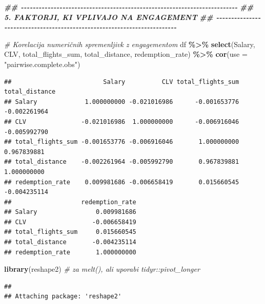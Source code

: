 \documentclass[
]{article}
\newenvironment{Shaded}{\begin{snugshade}}{\end{snugshade}}
\newcommand{\AttributeTok}[1]{\textcolor[rgb]{0.13,0.29,0.53}{#1}}
\newcommand{\CommentTok}[1]{\textcolor[rgb]{0.56,0.35,0.01}{\textit{#1}}}
\newcommand{\DocumentationTok}[1]{\textcolor[rgb]{0.56,0.35,0.01}{\textbf{\textit{#1}}}}
\newcommand{\FunctionTok}[1]{\textcolor[rgb]{0.13,0.29,0.53}{\textbf{#1}}}
\newcommand{\NormalTok}[1]{#1}
\newcommand{\SpecialCharTok}[1]{\textcolor[rgb]{0.81,0.36,0.00}{\textbf{#1}}}
\newcommand{\StringTok}[1]{\textcolor[rgb]{0.31,0.60,0.02}{#1}}
\begin{document}
\begin{Shaded}
\begin{Highlighting}[]
\DocumentationTok{\#\# {-}{-}{-}{-}{-}{-}{-}{-}{-}{-}{-}{-}{-}{-}{-}{-}{-}{-}{-}{-}{-}{-}{-}{-}{-}{-}{-}{-}{-}{-}{-}{-}{-}{-}{-}{-}{-}{-}{-}{-}{-}{-}{-}{-}{-}{-}{-}{-}{-}{-}{-}{-}{-}{-}{-}{-}{-}{-}{-}{-}{-}{-}{-}{-}{-}{-}{-}{-}{-}{-}{-}{-}{-}}
\DocumentationTok{\#\# 5. FAKTORJI, KI VPLIVAJO NA ENGAGEMENT}
\DocumentationTok{\#\# {-}{-}{-}{-}{-}{-}{-}{-}{-}{-}{-}{-}{-}{-}{-}{-}{-}{-}{-}{-}{-}{-}{-}{-}{-}{-}{-}{-}{-}{-}{-}{-}{-}{-}{-}{-}{-}{-}{-}{-}{-}{-}{-}{-}{-}{-}{-}{-}{-}{-}{-}{-}{-}{-}{-}{-}{-}{-}{-}{-}{-}{-}{-}{-}{-}{-}{-}{-}{-}{-}{-}{-}{-}}

\CommentTok{\# Korelacija numeričnih spremenljivk z engagementom}
\NormalTok{df }\SpecialCharTok{\%\textgreater{}\%}
  \FunctionTok{select}\NormalTok{(Salary, CLV, total\_flights\_sum, total\_distance, redemption\_rate) }\SpecialCharTok{\%\textgreater{}\%}
  \FunctionTok{cor}\NormalTok{(}\AttributeTok{use =} \StringTok{"pairwise.complete.obs"}\NormalTok{)}
\end{Highlighting}
\end{Shaded}

\begin{verbatim}
##                         Salary          CLV total_flights_sum total_distance
## Salary             1.000000000 -0.021016986      -0.001653776   -0.002261964
## CLV               -0.021016986  1.000000000      -0.006916046   -0.005992790
## total_flights_sum -0.001653776 -0.006916046       1.000000000    0.967839881
## total_distance    -0.002261964 -0.005992790       0.967839881    1.000000000
## redemption_rate    0.009981686 -0.006658419       0.015660545   -0.004235114
##                   redemption_rate
## Salary                0.009981686
## CLV                  -0.006658419
## total_flights_sum     0.015660545
## total_distance       -0.004235114
## redemption_rate       1.000000000
\end{verbatim}

\begin{Shaded}
\begin{Highlighting}[]
\FunctionTok{library}\NormalTok{(reshape2)  }\CommentTok{\# za melt(), ali uporabi tidyr::pivot\_longer}
\end{Highlighting}
\end{Shaded}

\begin{verbatim}
## 
## Attaching package: 'reshape2'
\end{verbatim}
\end{document}
